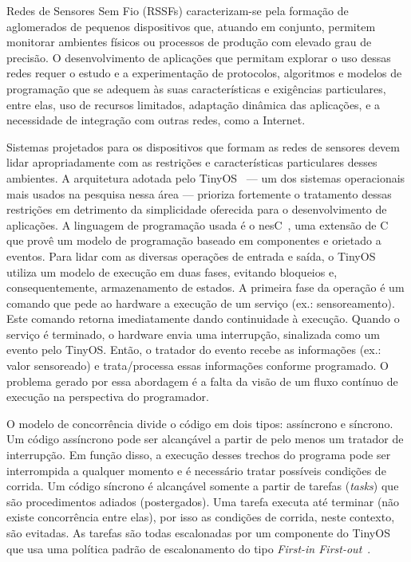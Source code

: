 Redes de Sensores Sem Fio (RSSFs) caracterizam-se pela formação de aglomerados de pequenos 
dispositivos que, atuando em conjunto, permitem monitorar ambientes físicos ou processos de 
produção com elevado grau de precisão. O desenvolvimento de aplicações que permitam explorar 
o uso dessas redes requer o estudo e a experimentação de protocolos, algoritmos e modelos de 
programação que se adequem às suas características e exigências particulares, entre elas, uso
de recursos limitados, adaptação dinâmica das aplicações, e a necessidade de integração com
outras redes, como a Internet.

Sistemas projetados para os dispositivos que formam as redes de sensores devem lidar apropriadamente
com as restrições e características particulares desses ambientes. 
A arquitetura adotada pelo TinyOS~\cite{tinyos/00} --- um dos sistemas operacionais mais usados
na pesquisa nessa área --- prioriza fortemente o tratamento dessas restrições em 
detrimento da simplicidade oferecida para o desenvolvimento de aplicações. 
A linguagem de programação usada é o nesC~\cite{nesc/03}, uma extensão de C que provê um modelo de programação baseado
em componentes e orietado a eventos.
Para lidar com as diversas operações de entrada e saída, o TinyOS utiliza um modelo de 
execução em duas fases, evitando bloqueios e, consequentemente, armazenamento de estados. 
A primeira fase da operação é um comando que pede ao hardware a execução de um serviço 
(ex.: sensoreamento). Este comando retorna imediatamente dando continuidade à execução. Quando o
serviço é terminado, o hardware envia uma interrupção, sinalizada como um evento pelo TinyOS. 
Então, o tratador do evento recebe as informações (ex.: valor sensoreado) e trata/processa essas informações conforme
programado\cite{LevisGay/09}. 
O problema gerado por essa abordagem é a falta da visão de um fluxo contínuo de execução 
na perspectiva do programador. 

O modelo de concorrência divide o código em dois tipos: assíncrono e síncrono. 
Um código assíncrono pode ser alcançável a partir de pelo menos
um tratador de interrupção. Em função disso, a execução desses trechos do programa pode ser interrompida
a qualquer momento e é necessário tratar possíveis condições de corrida.
Um código síncrono é alcançável somente a partir de tarefas (\textit{tasks}) que são 
procedimentos adiados (postergados). Uma tarefa executa até terminar (não existe concorrência entre elas), 
por isso as condições de corrida, neste contexto, são evitadas.  
As tarefas são todas escalonadas por um componente do TinyOS que usa uma política padrão de escalonamento 
do tipo \textit{First-in First-out}~\cite{LevisGay/09}.

